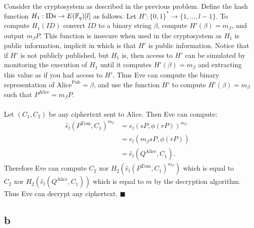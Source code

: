\documentclass[letterpaper,12pt,oneside,onecolumn]{article}
\begin{document}
\paragraph{}
Consider the cryptosystem as described in the previous problem. Define the hash function $H_1: \text{IDs} \rightarrow E(\mathbb{F}_q)[l]$ as follows. Let $H' : \{0,1\}^* \rightarrow \{1,\dots, l-1\}$. To compute $H_1(ID)$ convert $ID$ to a binary string $\beta$, compute $H'(\beta) = m_\beta$, and output $m_\beta P$. This function is insecure when used in the cryptosystem as $H_1$ is public information, implicit in which is that $H'$ is public information. Notice that if $H'$ is not publicly published, but $H_1$ is, then access to $H'$ can be simulated by monitoring the execution of $H_1$ until it computes $H'(\beta) = m_\beta$ and extracting this value as if you had access to $H'$. Thus Eve can compute the binary representation of $\text{Alice}^\text{Pub} = \beta$, and use the function $H'$ to compute $H'(\beta) = m_\beta$ such that $P^\text{Alice} = m_\beta P$.
\paragraph{}
Let $(C_1,C_2)$ be any ciphertext sent to Alice. Then Eve can compute:
\begin{align*}
\hat{e}_l(P^\text{Tom}, C_1)^{m_\beta} &= e_l(sP, \phi(rP))^{m_\beta} \\
&= e_l(m_\beta sP, \phi(rP)) \\
&= \hat{e}_l(Q^\text{Alice}, C_1).
\end{align*}
Therefore  Eve can compute $C_2\text{ xor } H_2(\hat{e}_l(P^\text{Tom}, C_1)^{m_\beta})$ which is equal to $C_2\text{ xor } H_2(\hat{e}_l(Q^\text{Alice}, C_1))$ which is equal to $m$ by the decryption algorithm. Thus Eve can decrypt any ciphertext. $\blacksquare$
\subsection*{b}
\end{document}
